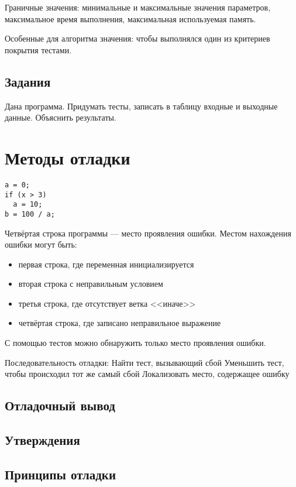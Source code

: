 \documentclass[14pt,openany]{book}
\begin{document}
Граничные значения: минимальные и максимальные значения параметров, максимальное время выполнения,
максимальная используемая память.

Особенные для алгоритма значения: чтобы выполнялся один из критериев покрытия тестами.

\section{Задания}

Дана программа. Придумать тесты, записать в таблицу входные и выходные данные.
Объяснить результаты.

\chapter{Методы отладки}

\begin{lstlisting}
a = 0;
if (x > 3)
  a = 10;
b = 100 / a;
\end{lstlisting}

Четвёртая строка программы --- место проявления ошибки.
Местом нахождения ошибки могут быть:
\begin{itemize}
\item первая строка, где переменная инициализируется
\item вторая строка с неправильным условием
\item третья строка, где отсутствует ветка <<иначе>>
\item четвёртая строка, где записано неправильное выражение
\end{itemize}

С помощью тестов можно обнаружить только место проявления ошибки.


Последовательность отладки:
Найти тест, вызывающий сбой
Уменьшить тест, чтобы происходил тот же самый сбой
Локализовать место, содержащее ошибку

\section{Отладочный вывод}

\section{Утверждения}

\section{Принципы отладки}
\end{document}
